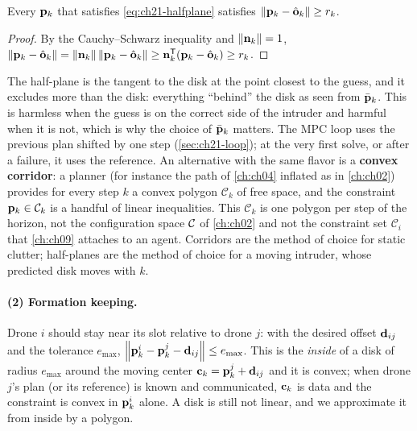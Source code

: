 \begin{proposition}
\label{thm:ch21-halfplane}
Every $\mathbf{p}_k$ that satisfies \cref{eq:ch21-halfplane} satisfies
$\left\lVert \mathbf{p}_k-\hat{\mathbf{o}}_k \right\rVert\ge r_k$.
\end{proposition}
\begin{proof}
By the Cauchy--Schwarz inequality and $\left\lVert \mathbf{n}_k \right\rVert=1$,
$\left\lVert \mathbf{p}_k-\hat{\mathbf{o}}_k \right\rVert=\left\lVert \mathbf{n}_k \right\rVert\left\lVert \mathbf{p}_k-\hat{\mathbf{o}}_k \right\rVert\ge\mathbf{n}_k^{\mathsf{T}}(\mathbf{p}_k-\hat{\mathbf{o}}_k)\ge r_k$. \qedhere
\end{proof}

The half-plane is the tangent to the disk at the point closest to the guess,
and it excludes more than the disk: everything ``behind'' the disk as seen from
$\bar{\mathbf{p}}_k$. This is harmless when the guess is on the correct side of the
intruder and harmful when it is not, which is why the choice of $\bar{\mathbf{p}}_k$
matters. The MPC loop uses the previous plan shifted by one step
(\cref{sec:ch21-loop}); at the very first solve, or after a failure, it uses
the reference. An alternative with the same flavor is a \textbf{convex
corridor}: a planner (for instance the path of
\cref{ch:ch04} inflated as in \cref{ch:ch02}) provides for every step $k$ a
convex polygon $\mathcal{C}_k$ of free space, and the constraint
$\mathbf{p}_k\in\mathcal{C}_k$ is a handful of linear inequalities. This
$\mathcal{C}_k$ is one polygon per step of the horizon, not the configuration
space $\mathcal{C}$ of \cref{ch:ch02} and not the constraint set $\mathcal{C}_i$
that \cref{ch:ch09} attaches to an agent. Corridors are
the method of choice for static clutter; half-planes are the method of choice
for a moving intruder, whose predicted disk moves with $k$.

\paragraph{(2) Formation keeping.}
Drone $i$ should stay near its slot relative to drone $j$: with the desired
offset $\mathbf{d}_{ij}$ and the tolerance $e_{\max}$,
$\left\lVert \mathbf{p}_k^{i}-\mathbf{p}_k^{j}-\mathbf{d}_{ij} \right\rVert\le e_{\max}$. This is the
\emph{inside} of a disk of radius $e_{\max}$ around the moving center
$\mathbf{c}_k=\mathbf{p}_k^{j}+\mathbf{d}_{ij}$ and it is convex; when drone $j$'s plan
(or its reference) is known and communicated, $\mathbf{c}_k$ is data and the
constraint is convex in $\mathbf{p}_k^{i}$ alone. A disk is still not linear, and
we approximate it from inside by a polygon.

